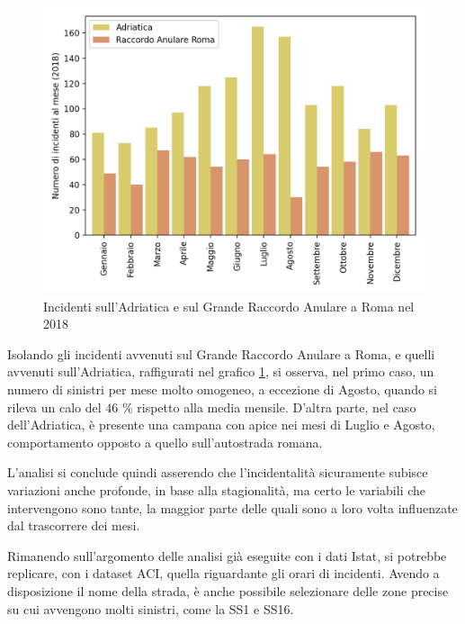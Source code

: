 \documentclass[a4paper,12pt]{report}
\begin{document}
\begin{figure}
    \hfill\includegraphics[width=0.7\linewidth]{../src/incidenti/incidenti_aci/autostrade/adriatica_roma.png}\hspace*{\fill}
    \caption{Incidenti sull'Adriatica e sul Grande Raccordo Anulare a Roma nel 2018}
    \label{fig:adriatica-roma}
\end{figure}

Isolando gli incidenti avvenuti sul Grande Raccordo Anulare a Roma, e quelli avvenuti 
sull'Adriatica, raffigurati nel grafico \ref{fig:adriatica-roma}, si osserva, 
nel primo caso, un numero di sinistri per mese molto omogeneo, a eccezione di 
Agosto, quando si rileva un calo del $46$ \% rispetto alla media mensile. 
D'altra parte, nel caso dell'Adriatica, è presente una campana con apice nei 
mesi di Luglio e Agosto, comportamento opposto a quello sull'autostrada 
romana. 

L'analisi si conclude quindi asserendo che l'incidentalità sicuramente subisce 
variazioni anche profonde, in base alla stagionalità, ma certo le variabili 
che intervengono sono tante, la maggior parte delle quali sono
a loro volta influenzate dal trascorrere dei mesi.



Rimanendo sull'argomento delle analisi già eseguite con i dati Istat, 
si potrebbe replicare, con i dataset ACI, quella riguardante gli orari di incidenti. 
Avendo a disposizione il nome della strada, è anche possibile selezionare delle zone precise 
su cui avvengono molti sinistri, come la SS1 e SS16. 
\end{document}
